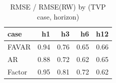 \begin{table}[ht]
\centering
\begin{tabular}{lrrrr}
  \hline
case & h1 & h3 & h6 & h12 \\ 
  \hline
FAVAR & 0.94 & 0.76 & 0.65 & 0.66 \\ 
  AR & 0.88 & 0.72 & 0.62 & 0.65 \\ 
  Factor & 0.95 & 0.81 & 0.72 & 0.62 \\ 
   \hline
\end{tabular}
\caption{RMSE / RMSE(RW) by (TVP case, horizon)} 
\label{tab:tvps_rmse_wide}
\end{table}
